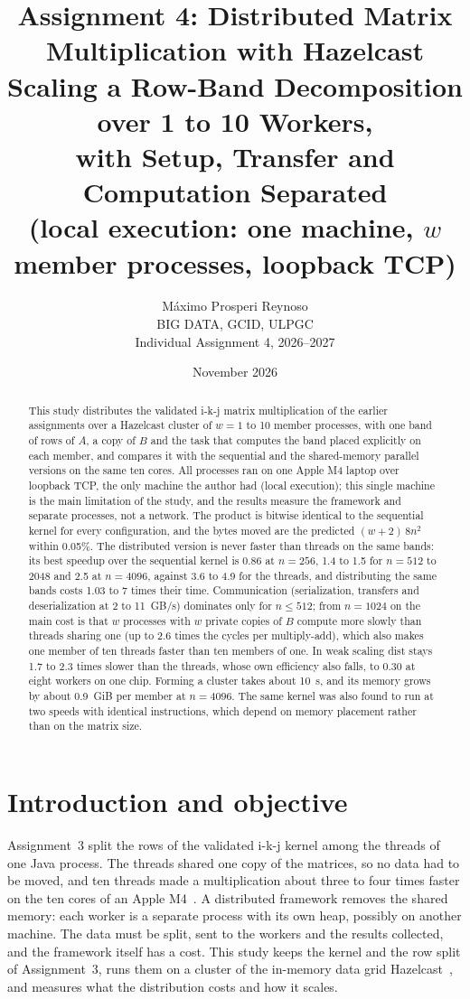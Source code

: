 \documentclass[11pt,a4paper]{article}
\title{\textbf{Assignment 4: Distributed Matrix Multiplication with Hazelcast}\\[4pt]
\large Scaling a Row-Band Decomposition over 1 to 10 Workers,\\
with Setup, Transfer and Computation Separated\\[2pt]
\normalsize (local execution: one machine, $w$ member processes, loopback TCP)}
\author{Máximo Prosperi Reynoso\\[2pt]
\small BIG DATA, GCID, ULPGC\\
\small Individual Assignment 4, 2026--2027\\[2pt]
\small \repourl}
\date{November 2026}
\begin{document}
\maketitle

\begin{abstract}
\noindent
This study distributes the validated i-k-j matrix multiplication of the earlier
assignments over a Hazelcast cluster of $w=1$ to 10 member processes, with one
band of rows of $A$, a copy of $B$ and the task that computes the band placed
explicitly on each member, and compares it with the sequential and the
shared-memory parallel versions on the same ten cores. All processes ran on one
Apple M4 laptop over loopback TCP, the only machine the author had (local
execution); this single machine is the main limitation of the study, and the
results measure the framework and separate processes, not a network. The product is bitwise
identical to the sequential kernel for every configuration, and the bytes moved
are the predicted $(w+2)\,8n^2$ within 0.05\%. The distributed version is never
faster than threads on the same bands: its best speedup over the sequential
kernel is 0.86 at $n=256$, 1.4 to 1.5 for $n=512$ to 2048 and 2.5 at $n=4096$,
against 3.6 to 4.9 for the threads, and distributing the same bands costs 1.03
to 7 times their time. Communication (serialization, transfers and
deserialization at 2 to 11~GB/s) dominates only for $n\le512$; from $n=1024$ on
the main cost is that $w$ processes with $w$ private copies of $B$ compute more
slowly than threads sharing one (up to 2.6 times the cycles per multiply-add),
which also makes one member of ten threads faster than ten members of one. In
weak scaling dist stays 1.7 to 2.3 times slower than the threads, whose own
efficiency also falls, to 0.30 at eight workers on one chip. Forming a cluster takes
about 10~s, and its memory grows by about 0.9~GiB per member at $n=4096$. The
same kernel was also found to run at two speeds with identical instructions,
which depend on memory placement rather than on the matrix size.
\end{abstract}

\section{Introduction and objective}

Assignment~3 split the rows of the validated i-k-j kernel among the threads of
one Java process. The threads shared one copy of the matrices, so no data had
to be moved, and ten threads made a multiplication about three to four times
faster on the ten cores of an Apple M4~\cite{a3report}. A distributed
framework removes the shared memory: each worker is a separate process with
its own heap, possibly on another machine. The data must be split, sent to the
workers and the results collected, and the framework itself has a cost. This
study keeps the kernel and the row split of Assignment~3, runs them on a
cluster of the in-memory data grid Hazelcast~\cite{hzexecutor}, and measures
what the distribution costs and how it scales.
\end{document}
